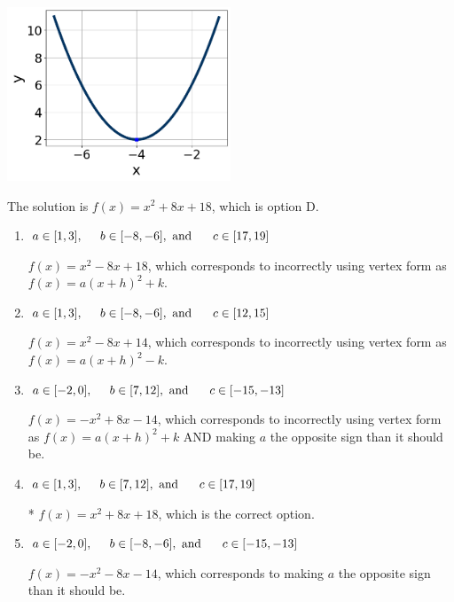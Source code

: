 \documentclass{extbook}[14pt]
\begin{document}
\begin{enumerate}
{\begin{center}
    \includegraphics[width=0.5\textwidth]{../Figures/quadraticGraphToEquationA.png}
\end{center}


The solution is \( f(x) = x^{2} +8 x + 18 \), which is option D.\begin{enumerate}[label=\Alph*.]
\item \( a \in [1, 3], \hspace*{5mm} b \in [-8, -6], \text{ and } \hspace*{5mm} c \in [17, 19] \)

$f(x)=x^{2} -8 x + 18$, which corresponds to incorrectly using vertex form as $f(x) = a(x+h)^2+k$.
\item \( a \in [1, 3], \hspace*{5mm} b \in [-8, -6], \text{ and } \hspace*{5mm} c \in [12, 15] \)

$f(x)=x^{2} -8 x + 14$, which corresponds to incorrectly using vertex form as $f(x) = a(x+h)^2 - k$.
\item \( a \in [-2, 0], \hspace*{5mm} b \in [7, 12], \text{ and } \hspace*{5mm} c \in [-15, -13] \)

$f(x)=-x^{2} +8 x -14$, which corresponds to incorrectly using vertex form as $f(x) = a(x+h)^2+k$ AND making $a$ the opposite sign than it should be.
\item \( a \in [1, 3], \hspace*{5mm} b \in [7, 12], \text{ and } \hspace*{5mm} c \in [17, 19] \)

* $f(x)=x^{2} +8 x + 18$, which is the correct option.
\item \( a \in [-2, 0], \hspace*{5mm} b \in [-8, -6], \text{ and } \hspace*{5mm} c \in [-15, -13] \)

$f(x)=-x^{2} -8 x -14$, which corresponds to making $a$ the opposite sign than it should be.
\end{enumerate}

}
\end{enumerate}
\end{document}
